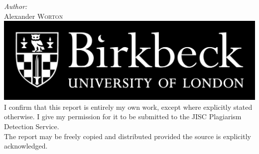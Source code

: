 \begin{titlepage}
\Large \emph{Author:}\\
Alexander \textsc{Worton}\\[2cm] %


\includegraphics[scale=0.15]{images/bbk1.png} 
\\[1cm]


{\small I confirm that this report is entirely my own work, except where explicitly stated otherwise. I give my permission for it to be submitted to the JISC Plagiarism Detection Service.\\[0.4cm]

The report may be freely copied and distributed provided the source is explicitly acknowledged.}


 

\vfill %

\end{titlepage}